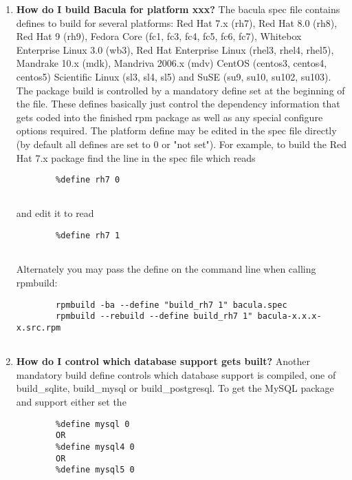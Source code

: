 \begin{enumerate}
\item 
   \label{faq1}
   {\bf How do I build Bacula for platform xxx?}
   The bacula spec file contains defines to build for several platforms:
   Red Hat 7.x (rh7), Red Hat 8.0 (rh8), Red Hat 9 (rh9), Fedora Core (fc1,
   fc3, fc4, fc5, fc6, fc7), Whitebox Enterprise Linux 3.0 (wb3), Red Hat Enterprise Linux 
   (rhel3, rhel4, rhel5), Mandrake 10.x (mdk), Mandriva 2006.x (mdv) CentOS (centos3, centos4, centos5) 
   Scientific Linux (sl3, sl4, sl5) and SuSE (su9, su10, su102, su103). The package build is controlled by a mandatory define set at the beginning of the file.  These defines basically just control the dependency information that gets coded into the finished rpm package as well 
   as any special configure options required.  The platform define may be edited 
   in the spec file directly (by default all defines are set to 0 or "not set").  
   For example, to build the Red Hat 7.x package find the line in the spec file
   which reads

\footnotesize
\begin{verbatim}
        %define rh7 0
        
\end{verbatim}
\normalsize

and edit it to read  

\footnotesize
\begin{verbatim}
        %define rh7 1
        
\end{verbatim}
\normalsize

Alternately you may pass the define on the command line when calling rpmbuild:
 

\footnotesize
\begin{verbatim}
        rpmbuild -ba --define "build_rh7 1" bacula.spec
        rpmbuild --rebuild --define build_rh7 1" bacula-x.x.x-x.src.rpm
        
\end{verbatim}
\normalsize

\item 
   \label{faq2}
   {\bf How do I control which database support gets built?}
   Another mandatory build define controls which database support is compiled,
   one of  build\_sqlite, build\_mysql or build\_postgresql. To get the MySQL
   package and support either  set the  

\footnotesize
\begin{verbatim}
        %define mysql 0
        OR
        %define mysql4 0
        OR
        %define mysql5 0
        

\end{verbatim}
\end{enumerate}
